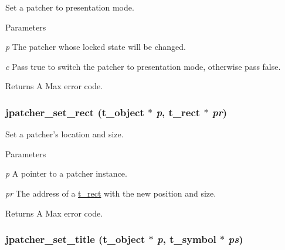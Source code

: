 Set a patcher to presentation mode. 
\begin{DoxyParams}{Parameters}
\item[{\em p}]The patcher whose locked state will be changed. \item[{\em c}]Pass true to switch the patcher to presentation mode, otherwise pass false. \end{DoxyParams}
\begin{DoxyReturn}{Returns}
A Max error code. 
\end{DoxyReturn}
\hypertarget{group__jpatcher_ga0a54c1b858851885088c5af970c9617d}{
\subsubsection[{jpatcher\_\-set\_\-rect}]{ jpatcher\_\-set\_\-rect ({\bf t\_\-object} $\ast$ {\em p}, \/  {\bf t\_\-rect} $\ast$ {\em pr})}}
\label{group__jpatcher_ga0a54c1b858851885088c5af970c9617d}


Set a patcher's location and size. 
\begin{DoxyParams}{Parameters}
\item[{\em p}]A pointer to a patcher instance. \item[{\em pr}]The address of a \hyperlink{structt__rect}{t\_\-rect} with the new position and size. \end{DoxyParams}
\begin{DoxyReturn}{Returns}
A Max error code. 
\end{DoxyReturn}
\hypertarget{group__jpatcher_gadd59390cab86f13282704e8bdf4ea3ba}{
\subsubsection[{jpatcher\_\-set\_\-title}]{ jpatcher\_\-set\_\-title ({\bf t\_\-object} $\ast$ {\em p}, \/  {\bf t\_\-symbol} $\ast$ {\em ps})}}
\label{group__jpatcher_gadd59390cab86f13282704e8bdf4ea3ba}


